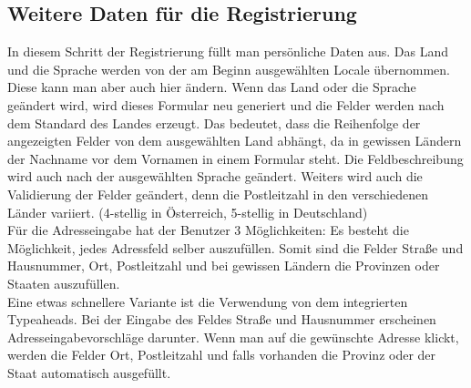 \subsection{Weitere Daten für die Registrierung}
In diesem Schritt der Registrierung füllt man persönliche Daten aus. Das Land und die Sprache werden von der am Beginn ausgewählten Locale übernommen. Diese kann man aber auch hier ändern. Wenn das Land oder die Sprache geändert wird, wird dieses Formular neu generiert und die Felder werden nach dem Standard des Landes erzeugt. Das bedeutet, dass die Reihenfolge der angezeigten Felder von dem ausgewählten Land abhängt, da in gewissen Ländern der Nachname vor dem Vornamen in einem Formular steht. Die Feldbeschreibung wird auch nach der ausgewählten Sprache geändert. Weiters wird auch die Validierung der Felder geändert, denn die Postleitzahl in den verschiedenen Länder variiert. (4-stellig in Österreich, 5-stellig in Deutschland)\\

Für die Adresseingabe hat der Benutzer 3 Möglichkeiten:
Es besteht die Möglichkeit, jedes Adressfeld selber auszufüllen. Somit sind die Felder Straße und Hausnummer, Ort, Postleitzahl und bei gewissen Ländern die Provinzen oder Staaten auszufüllen.\\

Eine etwas schnellere Variante ist die Verwendung von dem integrierten Typeaheads. Bei der Eingabe des Feldes Straße und Hausnummer erscheinen Adresseingabevorschläge darunter. Wenn man auf die gewünschte Adresse klickt, werden die Felder Ort, Postleitzahl und falls vorhanden die Provinz oder der Staat automatisch ausgefüllt.\\

